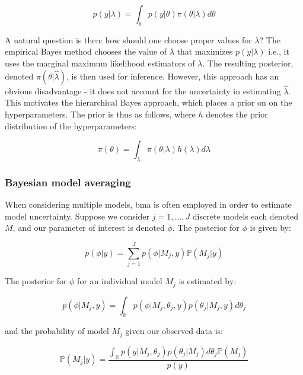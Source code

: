 \documentclass{report}
\begin{document}
\begin{equation}\label{eq:ols-bayes-y-marginal-on-lambda}
    p(y | \lambda) = \int_\theta p(y | \theta) \pi(\theta | \lambda) d\theta
\end{equation}

A natural question is then: how should one choose proper values for $\lambda$? The empirical Bayes method chooses the value of $\lambda$ that maximizes $p(y | \lambda)$ i.e., it uses the marginal maximum likelihood estimators of $\lambda$. The resulting posterior, denoted $\pi\left(\theta | \hat{\lambda}\right)$, is then used for inference. However, this approach has an obvious disadvantage - it does not account for the uncertainty in estimating $\hat{\lambda}$. This motivates the hierarchical Bayes approach, which places a prior on on the hyperparameters. The prior is thus as follows, where $h$ denotes the prior distribution of the hyperparameters:

\begin{equation}\label{eq:ols-bayes-hierarchical-prior}
    \pi(\theta) = \int_\lambda \pi(\theta | \lambda) h(\lambda) d\lambda
\end{equation}

\subsubsection{Bayesian model averaging}

When considering multiple models, \gls{bma} is often employed in order to estimate model uncertainty. Suppose we consider $j = 1, \dots, J$ discrete models each denoted $M$, and our parameter of interest is denoted $\phi$. The posterior for $\phi$ is given by:

\begin{equation}\label{eq:ols-bayes-bma-phi-posterior}
    p(\phi | y) = \sum_{j=1}^J p(\phi | M_j, y) \mathbb{P}(M_j | y)
\end{equation}

The posterior for $\phi$ for an individual model $M_j$ is estimated by:

\begin{equation}\label{eq:ols-bayes-bma-phi-posterior-individual}
    p(\phi | M_j, y) = \int_{\mathbb{R}} p(\phi | M_j, \theta_j, y) p(\theta_j | M_j, y) d\theta_j
\end{equation}

and the probability of model $M_j$ given our observed data is:

\begin{equation}\label{eq:ols-bayes-bma-model-prob}
    \mathbb{P}(M_j | y) = \frac{\int_{\mathbb{R}} p(y | M_j, \theta_j)p(\theta_j | M_j) d\theta_j \mathbb{P}(M_j)}{p(y)}
\end{equation}
\end{document}
